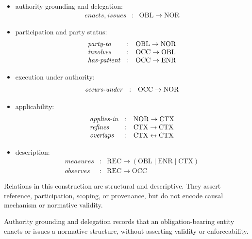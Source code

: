 \begin{itemize}

\item authority grounding and delegation:
{\small
\[
\begin{array}{lcl}
\textit{enacts},\ \textit{issues} &:& \mathrm{OBL} \to \mathrm{NOR}
\end{array}
\]
}

\item participation and party status:
{\small
\[
\begin{array}{lcl}
\textit{party\text{-}to}    &:& \mathrm{OBL} \to \mathrm{NOR} \\
\textit{involves}           &:& \mathrm{OCC} \to \mathrm{OBL} \\
\textit{has\text{-}patient} &:& \mathrm{OCC} \to \mathrm{ENR}
\end{array}
\]
}

\item execution under authority:
{\small
\[
\begin{array}{lcl}
\textit{occurs\text{-}under} &:& \mathrm{OCC} \to \mathrm{NOR}
\end{array}
\]
}

\item applicability:
{\small
\[
\begin{array}{lcl}
\textit{applies\text{-}in} &:& \mathrm{NOR} \to \mathrm{CTX} \\
\textit{refines}           &:& \mathrm{CTX} \to \mathrm{CTX} \\
\textit{overlaps}          &:& \mathrm{CTX} \leftrightarrow \mathrm{CTX}
\end{array}
\]
}

\item description:
{\small
\[
\begin{array}{lcl}
\textit{measures}           &:& \mathrm{REC} \to (\mathrm{OBL} \mid \mathrm{ENR} \mid \mathrm{CTX}) \\
\textit{observes}           &:& \mathrm{REC} \to \mathrm{OCC}
\end{array}
\]
}

\end{itemize}

Relations in this construction are structural and descriptive.
They assert reference, participation, scoping, or provenance,
but do not encode causal mechanism or normative validity.

Authority grounding and delegation records that an
obligation-bearing entity enacts or issues a normative structure,
without asserting validity or enforceability.

